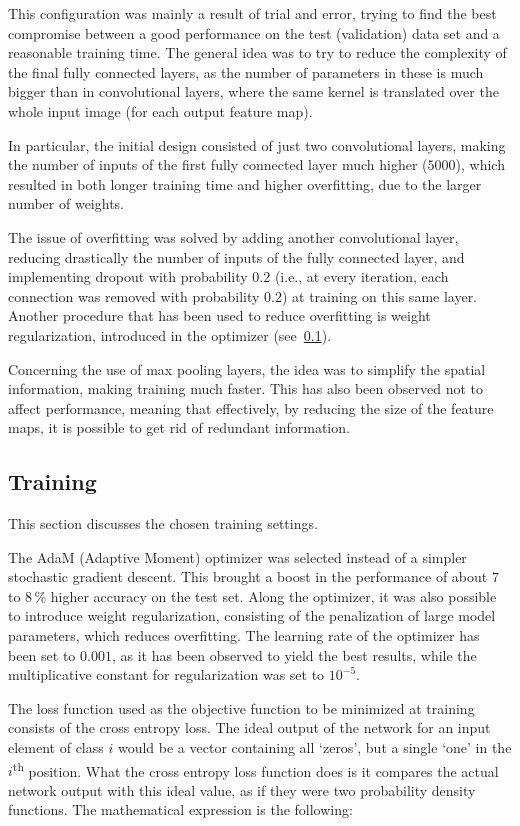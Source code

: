 \documentclass[12pt]{article}
\begin{document}
This configuration was mainly a result of trial and error, trying to find the best compromise between a good performance on the test (validation) data set and a reasonable training time.
The general idea was to try to reduce the complexity of the final fully connected layers, as the number of parameters in these is much bigger than in convolutional layers, where the same kernel is translated over the whole input image (for each output feature map).

In particular, the initial design consisted of just two convolutional layers, making the number of inputs of the first fully connected layer much higher ($5000$), which resulted in both longer training time and higher overfitting, due to the larger number of weights.

The issue of overfitting was solved by adding another convolutional layer, reducing drastically the number of inputs of the fully connected layer, and implementing dropout with probability $0.2$ (i.e., at every iteration, each connection was removed with probability $0.2$) at training on this same layer.
Another procedure that has been used to reduce overfitting is weight regularization, introduced in the optimizer (see\ \ref{sec:tr}).

Concerning the use of max pooling layers, the idea was to simplify the spatial information, making training much faster.
This has also been observed not to affect performance, meaning that effectively, by reducing the size of the feature maps, it is possible to get rid of redundant information.

\subsection{Training}\label{sec:tr}

This section discusses the chosen training settings.

The AdaM (Adaptive Moment) optimizer was selected instead of a simpler stochastic gradient descent.
This brought a boost in the performance of about $7$ to $8\, \%$ higher accuracy on the test set.
Along the optimizer, it was also possible to introduce weight regularization, consisting of the penalization of large model parameters, which reduces overfitting.
The learning rate of the optimizer has been set to $0.001$, as it has been observed to yield the best results, while the multiplicative constant for regularization was set to $10^{-5}$.

The loss function used as the objective function to be minimized at training consists of the cross entropy loss.
The ideal output of the network for an input element of class $i$ would be a vector containing all `zeros', but a single `one' in the $i$\textsuperscript{th} position.
What the cross entropy loss function does is it compares the actual network output with this ideal value, as if they were two probability density functions.
The mathematical expression is the following:
\end{document}
